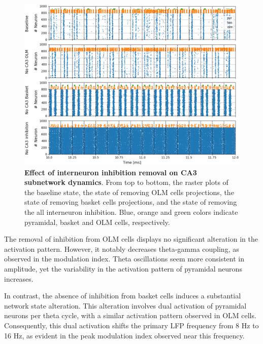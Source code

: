 \documentclass[../main.tex]{subfiles}
\begin{document}
\begin{figure}[t]
    \centering
    \includegraphics[width=\textwidth]{chapter4/figures/removing_interneurons/removing_interneurons_ca3_rasters.png}
    \caption{\textbf{Effect of interneuron inhibition removal on CA3 subnetwork dynamics}.
    From top to bottom, the raster plots of the baseline state, the state of removing OLM cells projections, the state of removing basket cells projections, and the state of removing the all interneuron inhibition.
    Blue, orange and green colors indicate pyramidal, basket and OLM cells, respectively.}
    \label{fig:interneurons-ca3-rasters}
\end{figure}
The removal of inhibition from OLM cells displays no significant alteration in the activation pattern.
However, it notably decreases theta-gamma coupling, as observed in the modulation index.
Theta oscillations seem more consistent in amplitude, yet the variability in the activation pattern of pyramidal neurons increases.

In contrast, the absence of inhibition from basket cells induces a substantial network state alteration.
This alteration involves dual activation of pyramidal neurons per theta cycle, with a similar activation pattern observed in OLM cells.
Consequently, this dual activation shifts the primary LFP frequency from 8 Hz to 16 Hz, as evident in the peak modulation index observed near this frequency.
\end{document}
